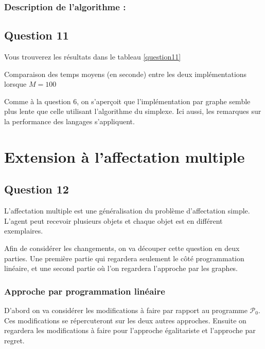 \documentclass[a4paper, titlepage, oneside, 12pt]{article}%
\begin{document}
\subsubsection{Description de l'algorithme :}


\subsection{Question 11}
Vous trouverez les résultats dans le tableau \ref{question11}
\begin{table}[h]
\begin{center}
\caption{Comparaison des temps moyens (en seconde) entre les deux implémentations lorsque $M=100$}
\label{question11}
\end{center}
\end{table}

Comme à la question $6$, on s'aperçoit que l'implémentation par graphe semble plus lente que celle utilisant l'algorithme du simplexe. Ici aussi, les remarques sur la performance des langages s'appliquent.
\section{Extension à l'affectation multiple}

\subsection{Question 12}

L'affectation multiple est une généralisation du problème d'affectation simple. L'agent peut recevoir plusieurs objets et chaque objet est en différent exemplaires.

Afin de considérer les changements, on va découper cette question en deux parties. Une première partie qui regardera seulement le côté programmation linéaire, et une second partie où l'on regardera l'approche par les graphes.

\subsubsection{Approche par programmation linéaire}

D'abord on va considérer les modifications à faire par rapport au programme $\mathcal{P}_0$. Ces modifications se répercuteront sur les deux autres approches. Ensuite on regardera les modifications à faire pour l'approche égalitariste et l'approche par regret.
\end{document}
